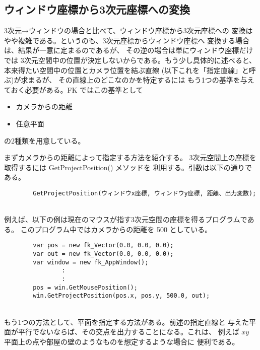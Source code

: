 \subsection{ウィンドウ座標から3次元座標への変換}
3次元→ウィンドウの場合と比べて、ウィンドウ座標から3次元座標への
変換はやや複雑である。というのも、3次元座標からウィンドウ座標へ
変換する場合は、結果が一意に定まるのであるが、
その逆の場合は単にウィンドウ座標だけでは
3次元空間中の位置が決定しないからである。もう少し具体的に述べると、
本来得たい空間中の位置とカメラ位置を結ぶ直線
(以下これを「指定直線」と呼ぶ)が求まるが、
その直線上のどこなのかを特定するには
もう1つの基準を与えておく必要がある。FK ではこの基準として
\begin{itemize}
 \item カメラからの距離
 \item 任意平面
\end{itemize}
の2種類を用意している。

まずカメラからの距離によって指定する方法を紹介する。
3次元空間上の座標を取得するには GetProjectPosition() メソッドを
利用する。引数は以下の通りである。
\\
\begin{screen}
\begin{verbatim}
        GetProjectPosition(ウィンドウx座標, ウィンドウy座標, 距離、出力変数);
\end{verbatim}
\end{screen}
~ \\
例えば、以下の例は現在のマウスが指す3次元空間の座標を得るプログラムである。
このプログラム中ではカメラからの距離を 500 としている。
\\
\begin{breakbox}
\begin{verbatim}
        var pos = new fk_Vector(0.0, 0.0, 0.0);
        var out = new fk_Vector(0.0, 0.0, 0.0);
        var window = new fk_AppWindow();
                :
                :
        pos = win.GetMousePosition();
        win.GetProjectPosition(pos.x, pos.y, 500.0, out);
\end{verbatim}
\end{breakbox}
~ \\
もう1つの方法として、平面を指定する方法がある。前述の指定直線と
与えた平面が平行でないならば、その交点を出力することになる。これは、
例えば \(xy\) 平面上の点や部屋の壁のようなものを想定するような場合に
便利である。

